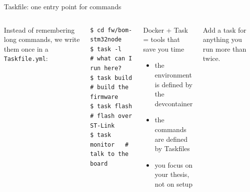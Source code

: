 \documentclass[aspectratio=169,10pt]{beamer}
\newcommand{\code}[1]{\texttt{#1}}
\begin{document}
\begin{frame}[fragile]{Taskfile: one entry point for commands}
  \begin{columns}[T,onlytextwidth]
      \small
      Instead of remembering long commands, we write them once in a \code{Taskfile.yml}:\par\medskip
      \scriptsize
\begin{verbatim}
$ cd fw/bom-stm32node
$ task -l        # what can I run here?
$ task build     # build the firmware
$ task flash     # flash over ST-Link
$ task monitor   # talk to the board
\end{verbatim}
      \begin{block}{Docker + Task = tools that save you time}
        \small
        \begin{itemize}
          \item the environment is defined by the devcontainer
          \item the commands are defined by Taskfiles
          \item you focus on your thesis, not on setup
        \end{itemize}
      \end{block}
      \vspace{4pt}
      {\scriptsize\color{ink!65}Add a task for anything you run more than twice.}
  \end{columns}
\end{frame}
\end{document}
